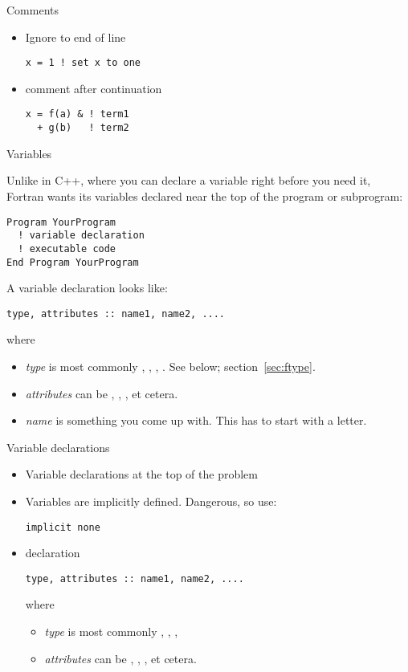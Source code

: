 \begin{slide}{Comments}
  \label{sl:fcomment}
  \begin{itemize}
  \item Ignore to end of line
\begin{verbatim}
x = 1 ! set x to one
\end{verbatim}
\item comment after continuation
\begin{verbatim}
x = f(a) & ! term1 
  + g(b)   ! term2
\end{verbatim}
  \end{itemize}
\end{slide}

 {Variables}

Unlike in C++, where you can declare a variable right before you need
it, Fortran wants its variables declared near the top of the program
or subprogram:
\begin{verbatim}
Program YourProgram
  ! variable declaration
  ! executable code
End Program YourProgram
\end{verbatim}
A variable declaration looks like:
\begin{verbatim}
type, attributes :: name1, name2, ....
\end{verbatim}
where
\begin{itemize}
\item \textit{type} is most commonly , , ,
  . See below; section~\ref{sec:ftype}.
\item \textit{attributes} can be , ,
  ,  et cetera.
\item \textit{name} is something you come up with. This has to start
  with a letter.
\end{itemize}

\begin{slide}{Variable declarations}
  \label{sl:fvars}
  \begin{itemize}
  \item Variable declarations at the top of the problem
  \item Variables are implicitly defined. Dangerous, so use:
\begin{verbatim}
implicit none
\end{verbatim}
\item declaration
\begin{verbatim}
type, attributes :: name1, name2, ....
\end{verbatim}
where
\begin{itemize}
\item \textit{type} is most commonly , , ,
\item \textit{attributes} can be , ,
  ,  et cetera.
  \end{itemize}
\end{itemize}
\end{slide}

